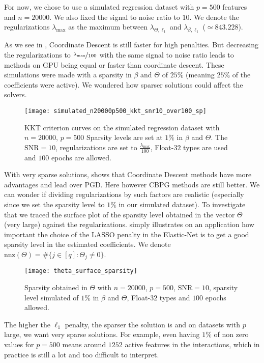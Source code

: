 \documentclass[../main.tex]{subfiles}
\begin{document}
For now, we chose to use a simulated regression dataset with $p=500$ features
and $n=20000$. We also fixed the signal to noise ratio to $10$.
We denote the regularizations $\lambda_{\max}$ as the maximum between
$\lambda_{\Theta,\ell_1}$ and $\lambda_{\beta, \ell_1}$ ($\simeq 843.228$).

\medskip

As we see in , Coordinate Descent is still faster for high
penalties. But decreasing the regularizations to $\nicefrac{\lambda_{\max}}{100}$
with the same signal to noise ratio leads to methods on GPU being equal or
faster than coordinate descent.
These simulations were made with a sparsity in $\beta$ and $\Theta$ of $25\%$
(meaning $25\%$ of the coefficients were active).
We wondered how sparser solutions could affect the solvers.

\begin{figure}[h]
	\centering
	\texttt{[image: simulated\_n20000p500\_kkt\_snr10\_over100\_sp]}
	\caption{KKT criterion curves on the simulated regression dataset with
	$n=20000$, $p=500$
	Sparsity levels are set at $1\%$ in $\beta$ and $\Theta$.
	The $\mathrm{SNR}=10$, regularizations are set to $\frac{\lambda_{\max}}{100}$,
	Float-$32$ types are used and $100$ epochs are allowed.}
	\label{fig:sparsity_solvers}
\end{figure}

\medskip

With very sparse solutions,  shows that Coordinate
Descent methods have more advantages and lead over PGD. Here however CBPG
methods are still better.
We can wonder if dividing regularizations by such factors are realistic
(especially since we set the sparsity level to $1\%$ in our simulated dataset).
To investigate that we traced the surface plot
of the sparsity level obtained in the vector $\Theta$ (very large) against the
regularizations.
 simply illustrates on an application how
important the choice of the LASSO penalty in the Elastic-Net is to get a good
sparsity level in the estimated coefficients.
We denote $\mathrm{nnz}(\Theta)=\# \{j\in[q]:\Theta_j\neq 0\}$.
%
\begin{figure}[!h]
	\centering
	\texttt{[image: theta\_surface\_sparsity]}
	\caption{Sparsity obtained in $\Theta$ with $n=20000$, $p=500$,
	$\mathrm{SNR}=10$, sparsity level simulated of $1\%$ in $\beta$ and
	$\Theta$, Float-$32$ types and $100$ epochs allowed.}
	\label{fig:sp_surf}
\end{figure}
%
The higher the $\ell_1$ penalty, the sparser the solution is and on datasets with
$p$ large, we want very sparse solutions.
For example, even having $1\%$ of non zero values for $p=500$ means around $1252$
active features in the interactions,
which in practice is still a lot and too difficult to interpret.
\end{document}
